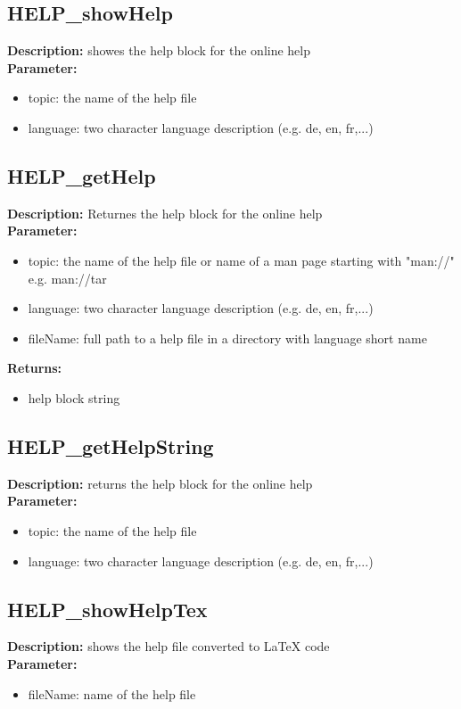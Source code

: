 \subsection{HELP\_showHelp}
\textbf{Description:} showes the help block for the online help\\
\textbf{Parameter:}
\begin{itemize}
\item topic: the name of the help file
\item language: two character language description (e.g. de, en, fr,...)
\end{itemize}

\subsection{HELP\_getHelp}
\textbf{Description:} Returnes the help block for the online help\\
\textbf{Parameter:}
\begin{itemize}
\item topic: the name of the help file or name of a man page starting with "man://" e.g. man://tar
\item language: two character language description (e.g. de, en, fr,...)
\item fileName: full path to a help file in a directory with language short name
\end{itemize}
\textbf{Returns:}
\begin{itemize}
\item help block string
\end{itemize}

\subsection{HELP\_getHelpString}
\textbf{Description:} returns the help block for the online help\\
\textbf{Parameter:}
\begin{itemize}
\item topic: the name of the help file
\item language: two character language description (e.g. de, en, fr,...)
\end{itemize}

\subsection{HELP\_showHelpTex}
\textbf{Description:} shows the help file converted to LaTeX code\\
\textbf{Parameter:}
\begin{itemize}
\item fileName: name of the help file
\end{itemize}

